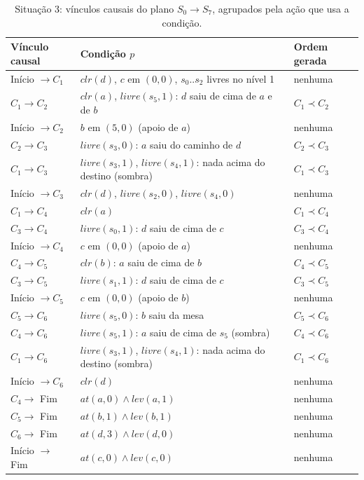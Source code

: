 \documentclass[11pt,a4paper]{article}
\newcommand{\clr}{\mathit{clr}}
\newcommand{\at}{\mathit{at}}
\newcommand{\lev}{\mathit{lev}}
\newcommand{\livre}{\mathit{livre}}
\begin{document}
\begin{table}[H]
\centering\small
\begin{tabular}{@{}lll@{}}
\toprule
Vínculo causal & Condição $p$ & Ordem gerada\\
\midrule
Início $\to C_1$ & $\clr(d)$, $c$ em $(0,0)$, $s_0..s_2$ livres no nível 1 & nenhuma\\
\midrule
$C_1 \to C_2$ & $\clr(a)$, $\livre(s_5,1)$: $d$ saiu de cima de $a$ e de $b$ & $C_1\prec C_2$\\
Início $\to C_2$ & $b$ em $(5,0)$ (apoio de $a$) & nenhuma\\
\midrule
$C_2 \to C_3$ & $\livre(s_3,0)$: $a$ saiu do caminho de $d$ & $C_2\prec C_3$\\
$C_1 \to C_3$ & $\livre(s_3,1)$, $\livre(s_4,1)$: nada acima do destino (sombra) & $C_1\prec C_3$\\
Início $\to C_3$ & $\clr(d)$, $\livre(s_2,0)$, $\livre(s_4,0)$ & nenhuma\\
\midrule
$C_1 \to C_4$ & $\clr(a)$ & $C_1\prec C_4$\\
$C_3 \to C_4$ & $\livre(s_0,1)$: $d$ saiu de cima de $c$ & $C_3\prec C_4$\\
Início $\to C_4$ & $c$ em $(0,0)$ (apoio de $a$) & nenhuma\\
\midrule
$C_4 \to C_5$ & $\clr(b)$: $a$ saiu de cima de $b$ & $C_4\prec C_5$\\
$C_3 \to C_5$ & $\livre(s_1,1)$: $d$ saiu de cima de $c$ & $C_3\prec C_5$\\
Início $\to C_5$ & $c$ em $(0,0)$ (apoio de $b$) & nenhuma\\
\midrule
$C_5 \to C_6$ & $\livre(s_5,0)$: $b$ saiu da mesa & $C_5\prec C_6$\\
$C_4 \to C_6$ & $\livre(s_5,1)$: $a$ saiu de cima de $s_5$ (sombra) & $C_4\prec C_6$\\
$C_1 \to C_6$ & $\livre(s_3,1)$, $\livre(s_4,1)$: nada acima do destino (sombra) & $C_1\prec C_6$\\
Início $\to C_6$ & $\clr(d)$ & nenhuma\\
\midrule
$C_4 \to$ Fim & $\at(a,0)\land\lev(a,1)$ & nenhuma\\
$C_5 \to$ Fim & $\at(b,1)\land\lev(b,1)$ & nenhuma\\
$C_6 \to$ Fim & $\at(d,3)\land\lev(d,0)$ & nenhuma\\
Início $\to$ Fim & $\at(c,0)\land\lev(c,0)$ & nenhuma\\
\bottomrule
\end{tabular}
\caption{Situação 3: vínculos causais do plano $S_0\to S_7$, agrupados pela ação que
usa a condição.}
\label{tab:pop3}
\end{table}
\end{document}
